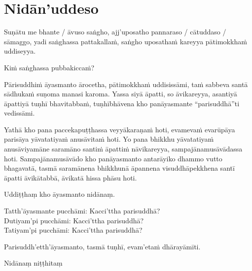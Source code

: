 \section{Nidān'uddeso}
\label{nidan'uddeso}

Suṇātu me bhante / āvuso saṅgho, ajj'uposatho pannaraso / cātuddaso / sāmaggo, yadi saṅghassa pattakallaṁ, saṅgho uposathaṁ kareyya pātimokkhaṁ uddiseyya.

Kiṁ saṅghassa pubbakiccaṁ?

Pārisuddhiṁ āyasmanto ārocetha, pātimokkhaṁ uddisissāmi, taṁ sabbeva santā sādhukaṁ suṇoma manasi karoma. Yassa siyā āpatti, so āvikareyya, asantiyā āpattiyā tuṇhī bhavitabbaṁ, tuṇhībhāvena kho panāyasmante “parisuddhā”ti vedissāmi.

Yathā kho pana paccekapuṭṭhassa veyyākaraṇaṁ hoti, evamevaṁ evarūpāya parisāya yāvatatiyaṁ anusāvitaṁ hoti. Yo pana bhikkhu yāvatatiyaṁ anusāviyamāne saramāno santiṁ āpattiṁ nāvikareyya, sampajānamusāvādassa hoti. Sampajānamusāvādo kho panāyasmanto antarāyiko dhammo vutto bhagavatā, tasmā saramānena bhikkhunā āpannena visuddhāpekkhena santī āpatti āvikātabbā, āvikatā hissa phāsu hoti.

\medskip

\begin{center}
Uddiṭṭhaṃ kho āyasmanto nidānaṃ.

\smallskip

Tatth'āyasmante pucchāmi: Kacci'ttha parisuddhā?\\
Dutiyam'pi pucchāmi: Kacci'ttha parisuddhā?\\
Tatiyam'pi pucchāmi: Kacci'ttha parisuddhā?

\smallskip

Parisuddh'etth'āyasmanto, tasmā tuṇhī, evam'etaṁ dhārayāmīti.
\end{center}

\begin{outro}
  Nidānaṃ niṭṭhitaṃ
\end{outro}

\clearpage

